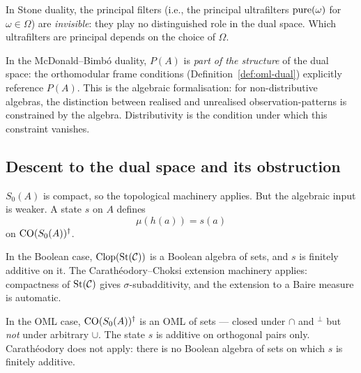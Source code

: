 \noindent In Stone duality, the principal filters (i.e., the
principal ultrafilters $\mathrm{pure}(\omega)$ for $\omega \in \Omega$) are
\emph{invisible}: they play no distinguished role in the dual space.
Which ultrafilters are principal depends on the choice of $\Omega$.

In the McDonald--Bimb\'{o} duality, $P(A)$ is \emph{part of the
structure} of the dual space: the orthomodular frame conditions
(Definition~\ref{def:oml-dual}) explicitly reference $P(A)$.  This
is the algebraic formalisation: for non-distributive algebras,
the distinction between realised and unrealised observation-patterns
is constrained by the algebra.  Distributivity is the condition
under which this constraint vanishes.

\subsection{Descent to the dual space and its obstruction}
\label{sec:descent}

\noindent
$S_0(A)$ is compact, so the topological machinery applies.
But the algebraic input is weaker.  A state $s$ on $A$ defines
\[
  \mu(h(a)) = s(a)
\]
on $\mathrm{CO}(S_0(A))^\dagger$.

In the Boolean case, $\mathrm{Clop}(\mathrm{St}(\mathcal{C}))$ is a Boolean algebra
of sets, and $s$ is finitely additive on it.  The
Carath\'{e}odory--Choksi extension machinery applies: compactness of
$\mathrm{St}(\mathcal{C})$ gives $\sigma$-subadditivity, and the extension
to a Baire measure is automatic.

In the OML case, $\mathrm{CO}(S_0(A))^\dagger$ is an OML of sets --- closed
under $\cap$ and ${}^\perp$ but \emph{not} under arbitrary $\cup$.
The state $s$ is additive on orthogonal pairs only.
Carath\'{e}odory does not apply: there is no Boolean algebra of
sets on which $s$ is finitely additive.

